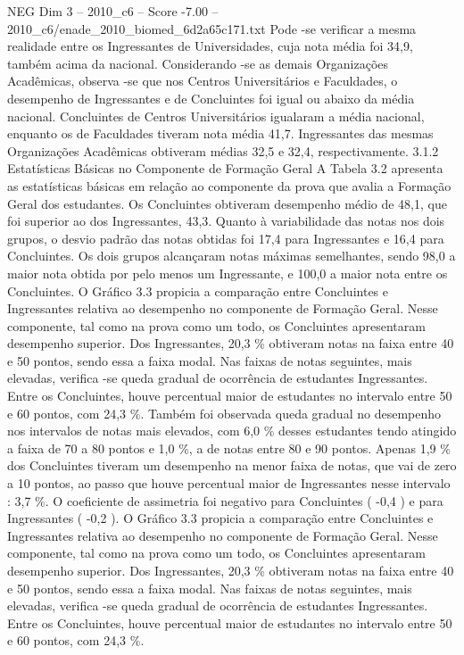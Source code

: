 \begin{textsample}{NEG Dim 3 – 2010\_c6 – Score -7.00 – 2010\_c6/enade\_2010\_biomed\_6d2a65c171.txt}
Pode -se verificar a mesma realidade entre os Ingressantes de Universidades, cuja nota média foi 34,9, também acima da nacional.
Considerando -se as demais Organizações Acadêmicas, observa -se que nos Centros Universitários e Faculdades, o desempenho de Ingressantes e de Concluintes foi igual ou abaixo da média nacional.
Concluintes de Centros Universitários igualaram a média nacional, enquanto os de Faculdades tiveram nota média 41,7.
Ingressantes das mesmas Organizações Acadêmicas obtiveram médias 32,5 e 32,4, respectivamente. 3.1.2 Estatísticas Básicas no Componente de Formação Geral A Tabela 3.2 apresenta as estatísticas básicas em relação ao componente da prova que avalia a Formação Geral dos estudantes.
Os Concluintes obtiveram desempenho médio de 48,1, que foi superior ao dos Ingressantes, 43,3.
Quanto à variabilidade das notas nos dois grupos, o desvio padrão das notas obtidas foi 17,4 para Ingressantes e 16,4 para Concluintes.
Os dois grupos alcançaram notas máximas semelhantes, sendo 98,0 a maior nota obtida por pelo menos um Ingressante, e 100,0 a maior nota entre os Concluintes.
O Gráfico 3.3 propicia a comparação entre Concluintes e Ingressantes relativa ao desempenho no componente de Formação Geral.
Nesse componente, tal como na prova como um todo, os Concluintes apresentaram desempenho superior.
Dos Ingressantes, 20,3 \% obtiveram notas na faixa entre 40 e 50 pontos, sendo essa a faixa modal.
Nas faixas de notas seguintes, mais elevadas, verifica -se queda gradual de ocorrência de estudantes Ingressantes.
Entre os Concluintes, houve percentual maior de estudantes no intervalo entre 50 e 60 pontos, com 24,3 \%.
Também foi observada queda gradual no desempenho nos intervalos de notas mais elevados, com 6,0 \% desses estudantes tendo atingido a faixa de 70 a 80 pontos e 1,0 \%, a de notas entre 80 e 90 pontos.
Apenas 1,9 \% dos Concluintes tiveram um desempenho na menor faixa de notas, que vai de zero a 10 pontos, ao passo que houve percentual maior de Ingressantes nesse intervalo : 3,7 \%.
O coeficiente de assimetria foi negativo para Concluintes ( -0,4 ) e para Ingressantes ( -0,2 ).
O Gráfico 3.3 propicia a comparação entre Concluintes e Ingressantes relativa ao desempenho no componente de Formação Geral.
Nesse componente, tal como na prova como um todo, os Concluintes apresentaram desempenho superior.
Dos Ingressantes, 20,3 \% obtiveram notas na faixa entre 40 e 50 pontos, sendo essa a faixa modal.
Nas faixas de notas seguintes, mais elevadas, verifica -se queda gradual de ocorrência de estudantes Ingressantes.
Entre os Concluintes, houve percentual maior de estudantes no intervalo entre 50 e 60 pontos, com 24,3 \%.

\end{textsample}
